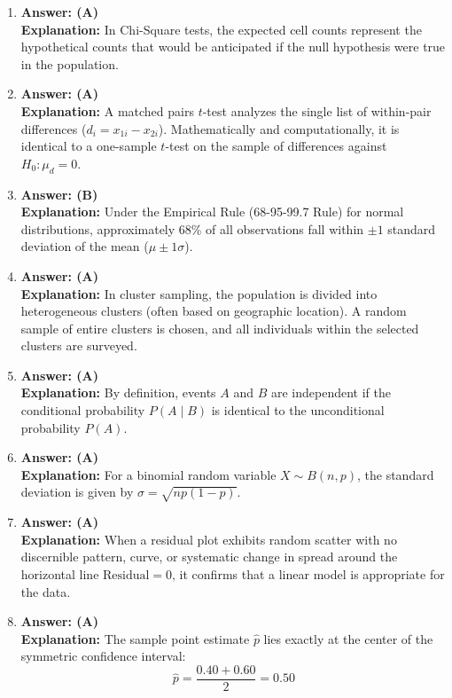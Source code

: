\begin{enumerate}[leftmargin=1.5em]
  \item \textbf{Answer: (A)} \\
  \textbf{Explanation:} In Chi-Square tests, the expected cell counts represent the hypothetical counts that would be anticipated if the null hypothesis were true in the population.

  \item \textbf{Answer: (A)} \\
  \textbf{Explanation:} A matched pairs $t$-test analyzes the single list of within-pair differences ($d_i = x_{1i} - x_{2i}$). Mathematically and computationally, it is identical to a one-sample $t$-test on the sample of differences against $H_0: \mu_d = 0$.

  \item \textbf{Answer: (B)} \\
  \textbf{Explanation:} Under the Empirical Rule (68-95-99.7 Rule) for normal distributions, approximately 68\% of all observations fall within $\pm 1$ standard deviation of the mean ($\mu \pm 1\sigma$).

  \item \textbf{Answer: (A)} \\
  \textbf{Explanation:} In cluster sampling, the population is divided into heterogeneous clusters (often based on geographic location). A random sample of entire clusters is chosen, and all individuals within the selected clusters are surveyed.

  \item \textbf{Answer: (A)} \\
  \textbf{Explanation:} By definition, events $A$ and $B$ are independent if the conditional probability $P(A \mid B)$ is identical to the unconditional probability $P(A)$.

  \item \textbf{Answer: (A)} \\
  \textbf{Explanation:} For a binomial random variable $X \sim B(n, p)$, the standard deviation is given by $\sigma = \sqrt{np(1-p)}$.

  \item \textbf{Answer: (A)} \\
  \textbf{Explanation:} When a residual plot exhibits random scatter with no discernible pattern, curve, or systematic change in spread around the horizontal line $\text{Residual} = 0$, it confirms that a linear model is appropriate for the data.

  \item \textbf{Answer: (A)} \\
  \textbf{Explanation:} The sample point estimate $\hat{p}$ lies exactly at the center of the symmetric confidence interval:
  \[ \hat{p} = \frac{0.40 + 0.60}{2} = 0.50 \]


\end{enumerate}
